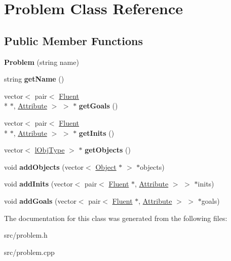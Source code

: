 \hypertarget{classProblem}{\section{Problem Class Reference}
\label{classProblem}
}
\subsection*{Public Member Functions}
\begin{DoxyCompactItemize}
\item 
\hypertarget{classProblem_a81a197d71ac4bdd30de43d4bca5fa442}{{\bfseries Problem} (string name)}\label{classProblem_a81a197d71ac4bdd30de43d4bca5fa442}

\item 
\hypertarget{classProblem_a98450f2eaaf0a1a3ac6c70eb61d579ec}{string {\bfseries get\+Name} ()}\label{classProblem_a98450f2eaaf0a1a3ac6c70eb61d579ec}

\item 
\hypertarget{classProblem_a2823b9fe2e443e9e698d1e24db7c1f9b}{vector$<$ pair$<$ \hyperlink{classFluent}{Fluent} \\*
$\ast$, \hyperlink{classAttribute}{Attribute} $>$ $>$ $\ast$ {\bfseries get\+Goals} ()}\label{classProblem_a2823b9fe2e443e9e698d1e24db7c1f9b}

\item 
\hypertarget{classProblem_a2d9b5f3e1d64be7e472c57366f7d6417}{vector$<$ pair$<$ \hyperlink{classFluent}{Fluent} \\*
$\ast$, \hyperlink{classAttribute}{Attribute} $>$ $>$ $\ast$ {\bfseries get\+Inits} ()}\label{classProblem_a2d9b5f3e1d64be7e472c57366f7d6417}

\item 
\hypertarget{classProblem_a9ffa45cc134b1773fbca2a2eb442b2a1}{vector$<$ \hyperlink{classlObjType}{l\+Obj\+Type} $>$ $\ast$ {\bfseries get\+Objects} ()}\label{classProblem_a9ffa45cc134b1773fbca2a2eb442b2a1}

\item 
\hypertarget{classProblem_a9578df4904a7995740bd1e0de27565ba}{void {\bfseries add\+Objects} (vector$<$ \hyperlink{classObject}{Object} $\ast$ $>$ $\ast$objects)}\label{classProblem_a9578df4904a7995740bd1e0de27565ba}

\item 
\hypertarget{classProblem_a4f384738f92ed625506d004cd6e71438}{void {\bfseries add\+Inits} (vector$<$ pair$<$ \hyperlink{classFluent}{Fluent} $\ast$, \hyperlink{classAttribute}{Attribute} $>$ $>$ $\ast$inits)}\label{classProblem_a4f384738f92ed625506d004cd6e71438}

\item 
\hypertarget{classProblem_abdfb74abe43f7e1a63310beaa70597cc}{void {\bfseries add\+Goals} (vector$<$ pair$<$ \hyperlink{classFluent}{Fluent} $\ast$, \hyperlink{classAttribute}{Attribute} $>$ $>$ $\ast$goals)}\label{classProblem_abdfb74abe43f7e1a63310beaa70597cc}

\end{DoxyCompactItemize}


The documentation for this class was generated from the following files\+:\begin{DoxyCompactItemize}
\item 
src/problem.\+h\item 
src/problem.\+cpp\end{DoxyCompactItemize}
